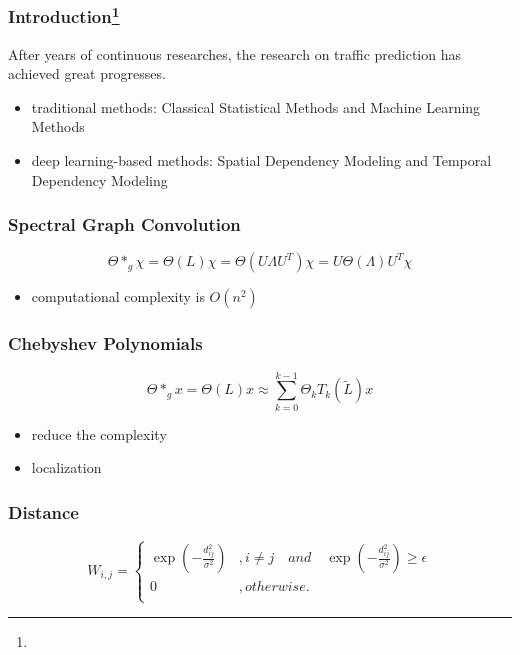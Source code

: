 \documentclass{beamer}
\begin{document}
\begin{frame}
  \frametitle{Introduction\footnote{}}
  After years of continuous researches, the research on traffic prediction has achieved great progresses.
  \begin{itemize}
    \item traditional methods: Classical Statistical Methods and Machine Learning Methods
    \item deep learning-based methods: Spatial Dependency Modeling and Temporal Dependency Modeling
  \end{itemize}
\end{frame}
\begin{frame}
  \frametitle{Spectral Graph Convolution}
  \begin{equation}
    \Theta *_{g} \chi = \Theta(L)\chi = \Theta(U \Lambda U^{T})\chi = U\Theta(\Lambda)U^{T}\chi
    \label{eq:convolution}
  \end{equation}
  \begin{itemize}
    \item computational complexity is $O(n^{2})$
  \end{itemize}
\end{frame}
\begin{frame}
  \frametitle{Chebyshev Polynomials}
  \begin{equation}
    \Theta \ast_{g} x = \Theta(L)x \approx \sum_{k=0}^{k-1} \Theta_{k} T_{k}(\widetilde{L})x
    \label{eq:approx-convolution}
  \end{equation}
  \begin{itemize}
    \item reduce the complexity
    \item localization
  \end{itemize}
\end{frame}
\begin{frame}
  \frametitle{Distance}
  \begin{equation}
    W_{i,j} = \left\{
      \begin{array}{ll}
        \exp(-\frac{d^{2}_{ij}}{\sigma^{2}}) & , i \neq j \quad and \quad \exp(-\frac{d^{2}_{ij}}{\sigma^{2}}) \geq \epsilon \\
        0 & , otherwise. \\
      \end{array}\right.
    \label{eq:distance}
  \end{equation}
\end{frame}
\end{document}

